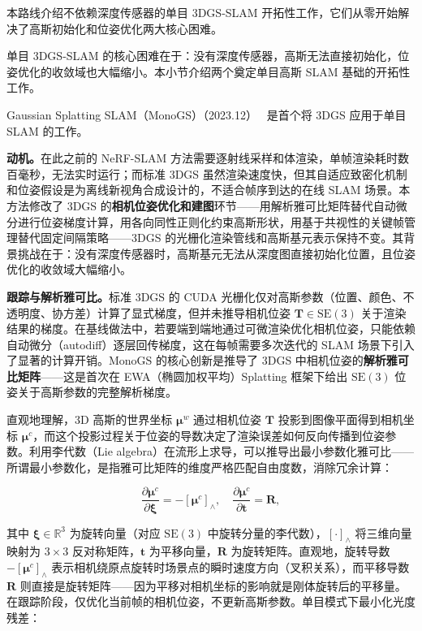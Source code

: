 本路线介绍不依赖深度传感器的单目 3DGS-SLAM 开拓性工作，它们从零开始解决了高斯初始化和位姿优化两大核心困难。

单目 3DGS-SLAM 的核心困难在于：没有深度传感器，高斯无法直接初始化，位姿优化的收敛域也大幅缩小。本小节介绍两个奠定单目高斯 SLAM 基础的开拓性工作。

Gaussian Splatting SLAM（MonoGS）（2023.12）~\cite{2312_06741} 是首个将 3DGS 应用于单目 SLAM 的工作。

\textbf{动机。}在此之前的 NeRF-SLAM 方法需要逐射线采样和体渲染，单帧渲染耗时数百毫秒，无法实时运行；而标准 3DGS 虽然渲染速度快，但其自适应致密化机制和位姿假设是为离线新视角合成设计的，不适合帧序到达的在线 SLAM 场景。本方法修改了 3DGS 的\textbf{相机位姿优化和建图}环节——用解析雅可比矩阵替代自动微分进行位姿梯度计算，用各向同性正则化约束高斯形状，用基于共视性的关键帧管理替代固定间隔策略——3DGS 的光栅化渲染管线和高斯基元表示保持不变。其背景挑战在于：没有深度传感器时，高斯基元无法从深度图直接初始化位置，且位姿优化的收敛域大幅缩小。

\textbf{跟踪与解析雅可比。}标准 3DGS 的 CUDA 光栅化仅对高斯参数（位置、颜色、不透明度、协方差）计算了显式梯度，但并未推导相机位姿 $\mathbf{T} \in \mathrm{SE}(3)$ 关于渲染结果的梯度。在基线做法中，若要端到端地通过可微渲染优化相机位姿，只能依赖自动微分（autodiff）逐层回传梯度，这在每帧需要多次迭代的 SLAM 场景下引入了显著的计算开销。MonoGS 的核心创新是推导了 3DGS 中相机位姿的\textbf{解析雅可比矩阵}——这是首次在 EWA（椭圆加权平均）Splatting 框架下给出 $\mathrm{SE}(3)$ 位姿关于高斯参数的完整解析梯度。

直观地理解，3D 高斯的世界坐标 $\boldsymbol{\mu}^w$ 通过相机位姿 $\mathbf{T}$ 投影到图像平面得到相机坐标 $\boldsymbol{\mu}^c$，而这个投影过程关于位姿的导数决定了渲染误差如何反向传播到位姿参数。利用李代数（Lie algebra）在流形上求导，可以推导出最小参数化雅可比——所谓最小参数化，是指雅可比矩阵的维度严格匹配自由度数，消除冗余计算：

\begin{equation*}
\frac{\partial \boldsymbol{\mu}^c}{\partial \boldsymbol{\xi}} = -[\boldsymbol{\mu}^c]_{\wedge}, \quad
\frac{\partial \boldsymbol{\mu}^c}{\partial \mathbf{t}} = \mathbf{R},
\end{equation*}

其中 $\boldsymbol{\xi} \in \mathbb{R}^3$ 为旋转向量（对应 $\mathrm{SE}(3)$ 中旋转分量的李代数），$[\cdot]_{\wedge}$ 将三维向量映射为 $3 \times 3$ 反对称矩阵，$\mathbf{t}$ 为平移向量，$\mathbf{R}$ 为旋转矩阵。直观地，旋转导数 $-[\boldsymbol{\mu}^c]_{\wedge}$ 表示相机绕原点旋转时场景点的瞬时速度方向（叉积关系），而平移导数 $\mathbf{R}$ 则直接是旋转矩阵——因为平移对相机坐标的影响就是刚体旋转后的平移量。在跟踪阶段，仅优化当前帧的相机位姿，不更新高斯参数。单目模式下最小化光度残差：

